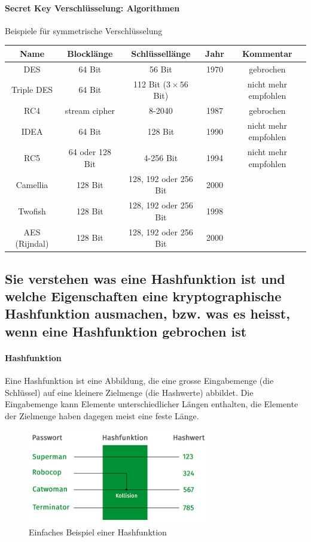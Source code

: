 \documentclass[10pt,a4paper]{article}
\begin{document}
\paragraph*{Secret Key Verschlüsselung: Algorithmen}Beispiele für symmetrische Verschlüsselung \newline
\begin{tabular}{|c|c|c|c|c|}
    \hline
    Name&Blocklänge&Schlüssellänge&Jahr&Kommentar\\
    \hline
    DES&64 Bit&56 Bit&1970&gebrochen\\
    Triple DES&64 Bit&112 Bit ($3\times56$ Bit)&  &nicht mehr empfohlen\\
    RC4&stream cipher&8-2040&1987&gebrochen\\
    IDEA&64 Bit&128 Bit&1990&nicht mehr empfohlen\\
    RC5&64 oder 128 Bit&4-256 Bit&1994&nicht mehr empfohlen\\
    Camellia&128 Bit&128, 192 oder 256 Bit&2000& \\
    Twofish&128 Bit&128, 192 oder 256 Bit&1998& \\
    AES (Rijndal)&128 Bit&128, 192 oder 256 Bit&2000& \\
    \hline
\end{tabular}


\subsection*{Sie verstehen was eine Hashfunktion ist und welche Eigenschaften eine kryptographische Hashfunktion ausmachen, bzw. was es heisst, wenn eine Hashfunktion gebrochen ist}

\paragraph*{Hashfunktion}\label{para:Hashfunktion}Eine Hashfunktion ist eine Abbildung, die eine grosse Eingabemenge (die Schlüssel) auf eine kleinere Zielmenge (die Hashwerte) abbildet. Die Eingabemenge kann Elemente unterschiedlicher Längen enthalten, die Elemente der Zielmenge haben dagegen meist eine feste Länge.
\begin{figure}[H]
    \begin{center}
    \includegraphics[width=8cm]{images/hash1.png}
    \caption{Einfaches Beispiel einer Hashfunktion}
    \label{hash1}
    \end{center}
\end{figure}
\end{document}
